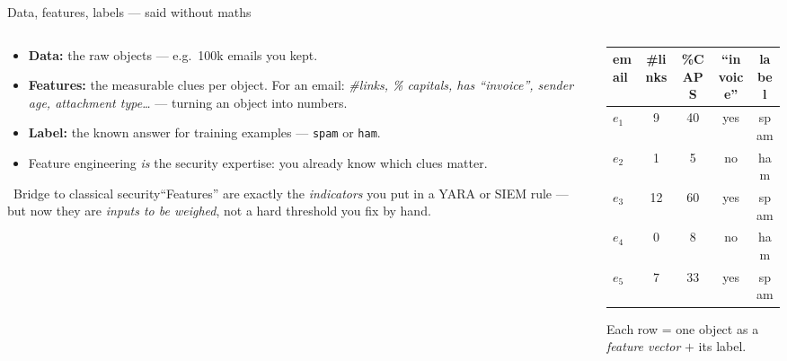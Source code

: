 \documentclass[aspectratio=169,10pt]{beamer}
\newcommand{\mlterm}[1]{{\color{accent}\textsf{\textbf{#1}}}} %
\newcommand{\bridge}[1]{%
  \begin{block}{\small\ding{43}\ Bridge to classical security}\small #1\end{block}}
\begin{document}
\begin{frame}{Data, features, labels --- said without maths}
  \begin{columns}[T]
    \begin{column}{0.56\textwidth}
      \begin{itemize}
        \item \mlterm{Data:} the raw objects --- e.g.\ 100k emails you kept.
        \item \mlterm{Features:} the measurable clues per object. For an email:
              \emph{\#links, \% capitals, has ``invoice'', sender age, attachment
              type\ldots} --- turning an object into numbers.
        \item \mlterm{Label:} the known answer for training examples ---
              \texttt{spam} or \texttt{ham}.
        \item Feature engineering \emph{is} the security expertise: you already
              know which clues matter.
      \end{itemize}
      \bridge{``Features'' are exactly the \emph{indicators} you put in a YARA or
      SIEM rule --- but now they are \emph{inputs to be weighed}, not a hard
      threshold you fix by hand.}
    \end{column}
    \begin{column}{0.44\textwidth}
      \centering
      \scriptsize
      \renewcommand{\arraystretch}{1.2}
      \begin{tabular}{lccc c}
        \toprule
        email & \#links & \%CAPS & ``invoice'' & label\\
        \midrule
        $e_1$ & 9  & 40 & yes & \textcolor{bad}{spam}\\
        $e_2$ & 1  & 5  & no  & \textcolor{good}{ham}\\
        $e_3$ & 12 & 60 & yes & \textcolor{bad}{spam}\\
        $e_4$ & 0  & 8  & no  & \textcolor{good}{ham}\\
        $e_5$ & 7  & 33 & yes & \textcolor{bad}{spam}\\
        \bottomrule
      \end{tabular}
      \par\vspace{0.5em}
      {\color{midgray}Each row = one object as a \emph{feature vector} $+$ its label.}
    \end{column}
  \end{columns}
\end{frame}
\end{document}
